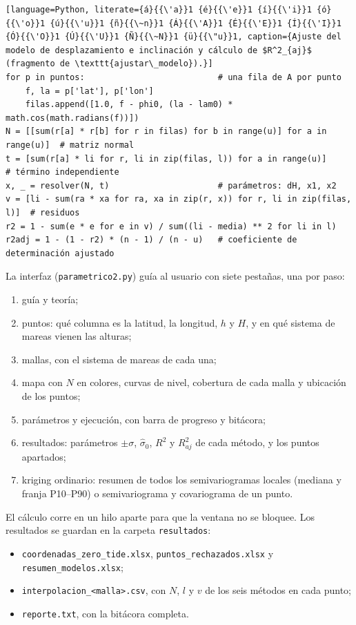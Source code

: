 \documentclass[11pt,letterpaper]{article}
\begin{document}
\begin{lstlisting}[language=Python, literate={á}{{\'a}}1 {é}{{\'e}}1 {í}{{\'i}}1 {ó}{{\'o}}1 {ú}{{\'u}}1 {ñ}{{\~n}}1 {Á}{{\'A}}1 {É}{{\'E}}1 {Í}{{\'I}}1 {Ó}{{\'O}}1 {Ú}{{\'U}}1 {Ñ}{{\~N}}1 {ü}{{\"u}}1, caption={Ajuste del modelo de desplazamiento e inclinación y cálculo de $R^2_{aj}$ (fragmento de \texttt{ajustar\_modelo}).}]
for p in puntos:                           # una fila de A por punto
    f, la = p['lat'], p['lon']
    filas.append([1.0, f - phi0, (la - lam0) * math.cos(math.radians(f))])
N = [[sum(r[a] * r[b] for r in filas) for b in range(u)] for a in range(u)]  # matriz normal
t = [sum(r[a] * li for r, li in zip(filas, l)) for a in range(u)]          # término independiente
x, _ = resolver(N, t)                      # parámetros: dH, x1, x2
v = [li - sum(ra * xa for ra, xa in zip(r, x)) for r, li in zip(filas, l)]  # residuos
r2 = 1 - sum(e * e for e in v) / sum((li - media) ** 2 for li in l)
r2adj = 1 - (1 - r2) * (n - 1) / (n - u)   # coeficiente de determinación ajustado
\end{lstlisting}

La interfaz (\texttt{parametrico2.py}) guía al usuario con siete pestañas, una por paso:
\begin{enumerate}
    \item guía y teoría;
    \item puntos: qué columna es la latitud, la longitud, $h$ y $H$, y en qué sistema de mareas
    vienen las alturas;
    \item mallas, con el sistema de mareas de cada una;
    \item mapa con $N$ en colores, curvas de nivel, cobertura de cada malla y ubicación de los
    puntos;
    \item parámetros y ejecución, con barra de progreso y bitácora;
    \item resultados: parámetros $\pm\sigma$, $\hat\sigma_0$, $R^2$ y $R^2_{aj}$ de cada método,
    y los puntos apartados;
    \item kriging ordinario: resumen de todos los semivariogramas locales (mediana y franja
    P10--P90) o semivariograma y covariograma de un punto.
\end{enumerate}
El cálculo corre en un hilo aparte para que la ventana no se bloquee. Los resultados se guardan
en la carpeta \texttt{resultados}:
\begin{itemize}
    \item \texttt{coordenadas\_zero\_tide.xlsx}, \texttt{puntos\_rechazados.xlsx} y
    \texttt{resumen\_modelos.xlsx};
    \item \texttt{interpolacion\_<malla>.csv}, con $N$, $l$ y $v$ de los seis métodos en cada
    punto;
    \item \texttt{reporte.txt}, con la bitácora completa.
\end{itemize}
\end{document}
